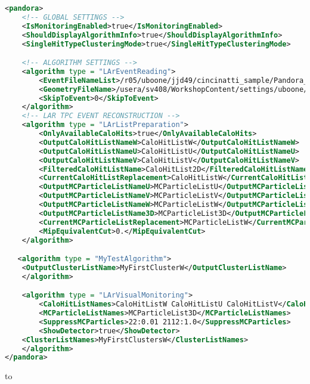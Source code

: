 \begin{lstlisting}[language=XML, caption=Previous version of PandoraSettings${\_}$Workshop.xml]
<pandora>
    <!-- GLOBAL SETTINGS -->
    <IsMonitoringEnabled>true</IsMonitoringEnabled>
    <ShouldDisplayAlgorithmInfo>true</ShouldDisplayAlgorithmInfo>
    <SingleHitTypeClusteringMode>true</SingleHitTypeClusteringMode>

    <!-- ALGORITHM SETTINGS -->
    <algorithm type = "LArEventReading">
        <EventFileNameList>/r05/uboone/jjd49/cincinatti_sample/Pandora_Events_Cincinatti_BNB_NuMu_1714.pndr</EventFileNameList>
        <GeometryFileName>/usera/sv408/WorkshopContent/settings/uboone/Geometry_MicroBooNE.xml</GeometryFileName>
        <SkipToEvent>0</SkipToEvent>
    </algorithm>
    <!-- LAR TPC EVENT RECONSTRUCTION -->
    <algorithm type = "LArListPreparation">
        <OnlyAvailableCaloHits>true</OnlyAvailableCaloHits>
        <OutputCaloHitListNameW>CaloHitListW</OutputCaloHitListNameW>
        <OutputCaloHitListNameU>CaloHitListU</OutputCaloHitListNameU>
        <OutputCaloHitListNameV>CaloHitListV</OutputCaloHitListNameV>
        <FilteredCaloHitListName>CaloHitList2D</FilteredCaloHitListName>
        <CurrentCaloHitListReplacement>CaloHitListW</CurrentCaloHitListReplacement>
        <OutputMCParticleListNameU>MCParticleListU</OutputMCParticleListNameU>
        <OutputMCParticleListNameV>MCParticleListV</OutputMCParticleListNameV>
        <OutputMCParticleListNameW>MCParticleListW</OutputMCParticleListNameW>
        <OutputMCParticleListName3D>MCParticleList3D</OutputMCParticleListName3D>
        <CurrentMCParticleListReplacement>MCParticleListW</CurrentMCParticleListReplacement>
        <MipEquivalentCut>0.</MipEquivalentCut>
    </algorithm>

   <algorithm type = "MyTestAlgorithm">
	<OutputClusterListName>MyFirstClusterW</OutputClusterListName>
    </algorithm>

    <algorithm type = "LArVisualMonitoring">
        <CaloHitListNames>CaloHitListW CaloHitListU CaloHitListV</CaloHitListNames>
        <MCParticleListNames>MCParticleList3D</MCParticleListNames>
        <SuppressMCParticles>22:0.01 2112:1.0</SuppressMCParticles>
        <ShowDetector>true</ShowDetector>
	<ClusterListNames>MyFirstClustersW</ClusterListNames>
    </algorithm>
</pandora>
\end{lstlisting}

to 

